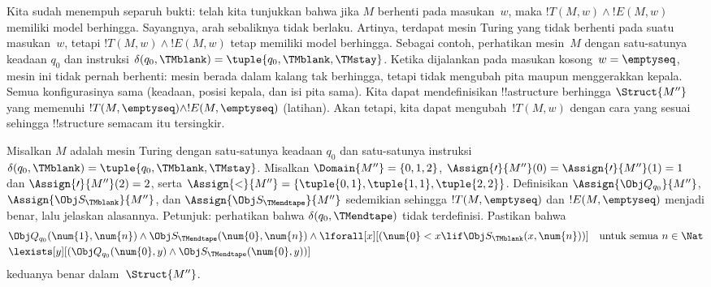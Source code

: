 \documentclass[../../../include/open-logic-section]{subfiles}
\begin{document}
\begin{explain}
  Kita sudah menempuh separuh bukti: telah kita tunjukkan bahwa jika $M$
  berhenti pada masukan~$w$, maka $!T(M,w) \land !E(M,w)$ memiliki model
  berhingga. Sayangnya, arah sebaliknya tidak berlaku. Artinya, terdapat mesin
  Turing yang tidak berhenti pada suatu masukan~$w$, tetapi
  $!T(M,w) \land !E(M,w)$ tetap memiliki model berhingga. Sebagai contoh,
  perhatikan mesin~$M$ dengan satu-satunya keadaan $q_0$ dan instruksi
  $\delta(q_0,\TMblank) = \tuple{q_0,\TMblank,\TMstay}$. Ketika dijalankan
  pada masukan kosong~$w = \emptyseq$, mesin ini tidak pernah berhenti: mesin
  berada dalam kalang tak berhingga, tetapi tidak mengubah pita maupun
  menggerakkan kepala. Semua konfigurasinya sama (keadaan, posisi kepala, dan
  isi pita sama). Kita dapat mendefinisikan !!a{structure} berhingga
  $\Struct{M''}$ yang memenuhi $!T(M,\emptyseq) \land !E(M,\emptyseq)$
  (latihan). Akan tetapi, kita dapat mengubah~$!T(M,w)$ dengan cara yang sesuai
  sehingga !!{structure} semacam itu tersingkir.

  \begin{prob}
    Misalkan $M$ adalah mesin Turing dengan satu-satunya keadaan $q_0$ dan
    satu-satunya instruksi
    $\delta(q_0,\TMblank) = \tuple{q_0,\TMblank,\TMstay}$.
    Misalkan $\Domain{M''} = \{0, 1, 2\}$,
    $\Assign{\prime}{M''}(0) = \Assign{\prime}{M''}(1) = 1$ dan
    $\Assign{\prime}{M''}(2) = 2$, serta
    $\Assign{<}{M''} = \{\tuple{0,1}, \tuple{1,1}, \tuple{2,2}\}$.
    Definisikan $\Assign{\Obj Q_{q_0}}{M''}$,
    $\Assign{\Obj S_{\TMblank}}{M''}$, dan
    $\Assign{\Obj S_{\TMendtape}}{M''}$ sedemikian sehingga
    $!T(M,\emptyseq)$ dan $!E(M,\emptyseq)$ menjadi benar, lalu jelaskan
    alasannya. Petunjuk: perhatikan bahwa $\delta(q_0, \TMendtape)$ tidak
    terdefinisi. Pastikan bahwa
    \begin{align*}
    & \Obj Q_{q_0}(\num{1}, \num{n}) \land \Obj S_{\TMendtape}(\num{0}, \num{n})
      \land
      \lforall[x][(\num{0} < x \lif \Obj S_\TMblank(x, \num{n}))]
      \text{\quad untuk semua $n \in \Nat$}\\
    & \lexists[y][(\Obj Q_{q_0}(\num{0}, y) \land \Obj S_{\TMendtape}(\num{0}, y))]
    \end{align*}
    keduanya benar dalam~$\Struct{M''}$.
  \end{prob}
\end{explain}
\end{document}
